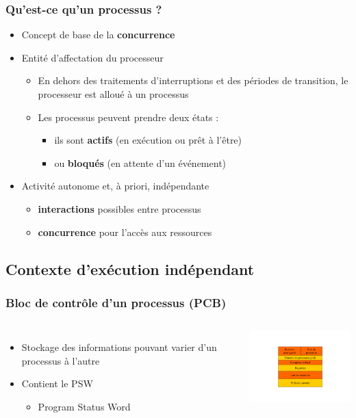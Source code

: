 \begin{frame}
\frametitle{Qu'est-ce qu'un processus ?}
\begin{itemize}
\item Concept de base de la \textbf{concurrence}
\item Entité d'affectation du processeur
\begin{itemize}
\item En dehors des traitements d'interruptions et des périodes de transition, le processeur est alloué à un processus
\item Les processus peuvent prendre deux états :
\begin{itemize}
\item ils sont \textbf{actifs} (en exécution ou prêt à l'être)
\item ou \textbf{bloqués} (en attente d'un événement)
\end{itemize}

\end{itemize}
\item Activité autonome et, à priori, indépendante
\begin{itemize}
\item \textbf{interactions} possibles entre processus
\item \textbf{concurrence} pour l'accès aux ressources
\end{itemize}
\end{itemize}
\end{frame}

\subsection{Contexte d'exécution indépendant}

\begin{frame}
\frametitle{Bloc de contrôle d’un processus (PCB)}
\begin{columns}
\begin{itemize}
\item Stockage des informations pouvant varier d’un processus à l’autre
\item Contient le PSW
\begin{itemize}
\item Program Status Word
\end{itemize}
\end{itemize}
\includegraphics[width=5cm]{../illustration/PCB.pdf}
\end{columns}
\end{frame}

